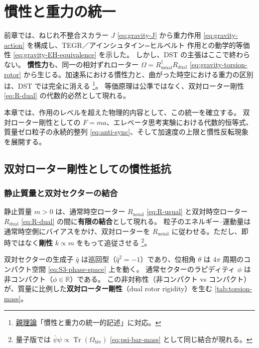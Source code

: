 \documentclass[dvipdfmx,a4paper,oneside]{jsbook}
\numberwithin{equation}{chapter}
\begin{document}
\chapter{慣性と重力の統一}

前章では、ねじれ不整合スカラー \(J\) \eqref{eq:gravity-J} から重力作用 \eqref{eq:gravity-action} を構成し、TEGR／アインシュタイン=ヒルベルト 作用との動学的等価性 \eqref{eq:gravity-EH-equivalence} を示した。
しかし、DST の主張はここで終わらない。
\textbf{慣性力}も、同一の相対ずれローター \(\Omega = R_{\mathrm{usual}}^\dagger R_{\mathrm{dual}}\) \eqref{eq:gravity-torsion-rotor} から生じる。加速系における慣性力と、曲がった時空における重力の区別は、DST では完全に消える \footnote{\hyperref[sec:sister-manuscripts]{親理論}「慣性と重力の統一的記述」に対応。}。
等価原理は公準ではなく、双対ローター剛性 \eqref{eq:R-dual} の代数的必然として現れる。

本章では、作用のレベルを超えた物理的内容として、この統一を確立する。
双対ローター剛性としての \(F = ma\)、エレベータ思考実験における代数的恒等式、質量ゼロ粒子の永続的整列 \eqref{eq:anti-sync}、そして加速度の上限と慣性反転現象を展開する。

\section{双対ローター剛性としての慣性抵抗}

\subsection{静止質量と双対セクターの結合}

静止質量 \(m > 0\) は、通常時空ローター \(R_{\mathrm{usual}}\) \eqref{eq:R-usual} と双対時空ローター \(R_{\mathrm{dual}}\) \eqref{eq:R-dual} の間に\textbf{有限の結合}として現れる。
粒子のエネルギー--運動量は通常時空側にバイアスをかけ、双対ローターを \(R_{\mathrm{usual}}\) に従わせる。ただし、即時ではなく\textbf{剛性} \(k \propto m\) をもって追従させる \footnote{量子版では \(\bar\psi\psi \propto \operatorname{Tr}(\Omega_{\mathrm{biv}})\) \eqref{eq:psi-bar-mass} として同じ結合が現れる。}。

双対セクターの生成子 \(\hat{q}\) は巡回型（\(\hat{q}^2 = -1\)）であり、位相角 \(\theta\) は \(4\pi\) 周期のコンパクト空間 \eqref{eq:S3-phase-space} 上を動く。
通常セクターのラピディティ \(\phi\) は非コンパクト（\(\phi \in \mathbb{R}\)）である。
この非対称性（非コンパクト vs コンパクト）が、質量に比例した\textbf{双対ローター剛性}（dual rotor rigidity）を生む \eqref{tab:torsion-mass}。
\end{document}
